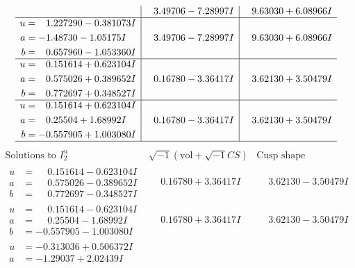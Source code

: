 \documentclass[1p]{elsarticle_modified}
\theoremstyle{definition}
\newcommand{\I}{\sqrt{-1}}
\begin{document}
$$\begin{array}{c|c|c}
 & \phantom{-}3.49706 - 7.28997 I & \phantom{-}9.63030 + 6.08966 I \\ \hline\begin{aligned}
u &= \phantom{-}1.227290 - 0.381073 I \\
a &= -1.48730 - 1.05175 I \\
b &= \phantom{-}0.657960 - 1.053360 I\end{aligned}
 & \phantom{-}3.49706 - 7.28997 I & \phantom{-}9.63030 + 6.08966 I \\ \hline\begin{aligned}
u &= \phantom{-}0.151614 + 0.623104 I \\
a &= \phantom{-}0.575026 + 0.389652 I \\
b &= \phantom{-}0.772697 + 0.348527 I\end{aligned}
 & \phantom{-}0.16780 - 3.36417 I & \phantom{-}3.62130 + 3.50479 I \\ \hline\begin{aligned}
u &= \phantom{-}0.151614 + 0.623104 I \\
a &= \phantom{-}0.25504 + 1.68992 I \\
b &= -0.557905 + 1.003080 I\end{aligned}
 & \phantom{-}0.16780 - 3.36417 I & \phantom{-}3.62130 + 3.50479 I\\
 \hline 
 \end{array}$$\newpage$$\begin{array}{c|c|c}  
\text{Solutions to }I^u_{2}& \I (\text{vol} + \sqrt{-1}CS) & \text{Cusp shape}\\
 \hline 
\begin{aligned}
u &= \phantom{-}0.151614 - 0.623104 I \\
a &= \phantom{-}0.575026 - 0.389652 I \\
b &= \phantom{-}0.772697 - 0.348527 I\end{aligned}
 & \phantom{-}0.16780 + 3.36417 I & \phantom{-}3.62130 - 3.50479 I \\ \hline\begin{aligned}
u &= \phantom{-}0.151614 - 0.623104 I \\
a &= \phantom{-}0.25504 - 1.68992 I \\
b &= -0.557905 - 1.003080 I\end{aligned}
 & \phantom{-}0.16780 + 3.36417 I & \phantom{-}3.62130 - 3.50479 I \\ \hline\begin{aligned}
u &= -0.313036 + 0.506372 I \\
a &= -1.29037 + 2.02439 I \\

\end{aligned}
\end{array}$$
\end{document}
